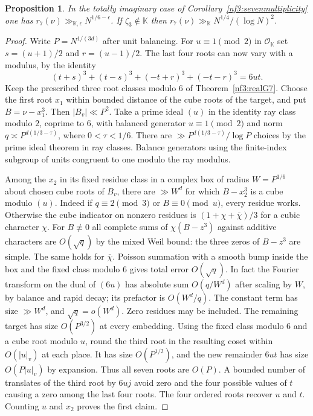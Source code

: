 \documentclass[11pt,letterpaper]{article}
\newtheorem{proposition}[proposition]{Proposition}
\theoremstyle{definition}
\numberwithin{equation}{section}
\begin{document}
\begin{proposition}\label{nf3:imag-seven-many}
In the totally imaginary case of Corollary~\ref{nf3:sevenmultiplicity}
one has $r_7(\nu)\gg_{\mathbb K,\epsilon}N^{1/6-\epsilon}$.
If $\zeta_3\notin\mathbb K$ then
$r_7(\nu)\gg_{\mathbb K}N^{1/4}/(\log N)^2$.
\end{proposition}
\begin{proof}
Write $P=N^{1/(3d)}$ after unit balancing. For $u\equiv1\pmod2$
in $\mathcal O_{\mathbb K}$ set $s=(u+1)/2$ and $r=(u-1)/2$.
The last four roots can now vary with a modulus, by the identity
\[
 (t+s)^3+(t-s)^3+(-t+r)^3+(-t-r)^3=6ut .
\]
Keep the prescribed three root classes modulo $6$ of
Theorem~\ref{nf3:realG7}. Choose the first root $x_1$ within bounded
distance of the cube roots of the target, and put $B=\nu-x_1^3$.
Then $|B_v|\ll P^2$. Take a prime ideal $(u)$ in the identity
ray class modulo $2$, coprime to $6$, with balanced generator
$u\equiv1\pmod2$ and norm $q\asymp P^{d(1/3-\tau)}$,
where $0<\tau<1/6$. There are
$\gg P^{d(1/3-\tau)}/\log P$ choices by the prime ideal theorem
in ray classes. Balance generators using the finite-index subgroup
of units congruent to one modulo the ray modulus.

Among the $x_2$ in its fixed residue class in a complex box of
radius $W=P^{1/6}$ about chosen cube roots of $B_v$, there are
$\gg W^d$ for which $B-x_2^3$ is a cube modulo $(u)$.
Indeed if $q\equiv2\pmod3$ or $B\equiv0\pmod u$, every residue
works. Otherwise the cube indicator on nonzero residues is
$(1+\chi+\overline\chi)/3$ for a cubic character $\chi$.
For $B\not\equiv0$ all complete sums of $\chi(B-z^3)$ against
additive characters are $O(\sqrt q)$ by the mixed Weil bound:
the three zeros of $B-z^3$ are simple. The same holds for
$\overline\chi$. Poisson summation with a smooth bump inside the
box and the fixed class modulo $6$ gives total error $O(\sqrt q)$.
In fact the Fourier transform on the dual of $(6u)$ has absolute
sum $O(q/W^d)$ after scaling by $W$, by balance and rapid decay;
its prefactor is $O(W^d/q)$. The constant term has size
$\gg W^d$, and $\sqrt q=o(W^d)$. Zero residues may be included.
The remaining target has size $O(P^{3/2})$ at every embedding.
Using the fixed class modulo $6$ and a cube root modulo $u$,
round the third root in the resulting coset within $O(|u|_v)$
at each place. It has size $O(P^{1/2})$, and the new remainder
$6ut$ has size $O(P|u|_v)$ by expansion. Thus all seven roots
are $O(P)$. A bounded number of translates of the third root by
$6u j$ avoid zero and the four possible values of $t$ causing a
zero among the last four roots. The four ordered roots recover
$u$ and $t$. Counting $u$ and $x_2$ proves the first claim.


\end{proof}
\end{document}
